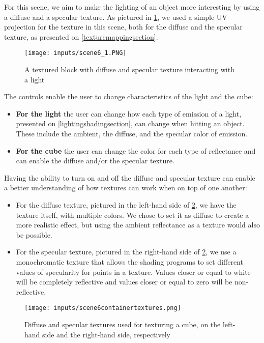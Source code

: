 \documentclass[cic,tc,english]{iiufrgs}
\begin{document}
For this scene, we aim to make the lighting of an object more interesting by using a diffuse and a specular texture. As pictured in \cref{scene6demo}, we used a simple UV projection for the texture in this scene, both for the diffuse and the specular texture, as presented on \cref{texturemappingsection}.

\begin{figure}[hbt!]
    \caption{A textured block with diffuse and specular texture interacting with a light}
    \begin{center}
        \texttt{[image: inputs/scene6\_1.PNG]}
    \end{center}
    \label{scene6demo}
\end{figure}

The controls enable the user to change characteristics of the light and the cube:
\begin{itemize}
    \item \textbf{For the light }the user can change how each type of emission of a light, presented on \cref{lightingshadingsection}, can change when hitting an object. These include the ambient, the diffuse, and the specular color of emission.
    \item \textbf{For the cube} the user can change the color for each type of reflectance and can enable the diffuse and/or the specular texture.
\end{itemize}

Having the ability to turn on and off the diffuse and specular texture can enable a better understanding of how textures can work when on top of one another: 
\begin{itemize}
    \item For the diffuse texture, pictured in the left-hand side of \cref{scene6textures}, we have the texture itself, with multiple colors. We chose to set it as diffuse to create a more realistic effect, but using the ambient reflectance as a texture would also be possible.
    \item For the specular texture, pictured in the right-hand side of \cref{scene6textures}, we use a monochromatic texture that allows the shading programs to set different values of specularity for points in a texture. Values closer or equal to white will be completely reflective and values closer or equal to zero will be non-reflective.
\end{itemize}

\begin{figure}[hbt!]
    \caption{Diffuse and specular textures used for texturing a cube, on the left-hand side and the right-hand side, respectively}
    \begin{center}
        \texttt{[image: inputs/scene6containertextures.png]}
    \end{center}
    \label{scene6textures}
\end{figure}
%
\end{document}
